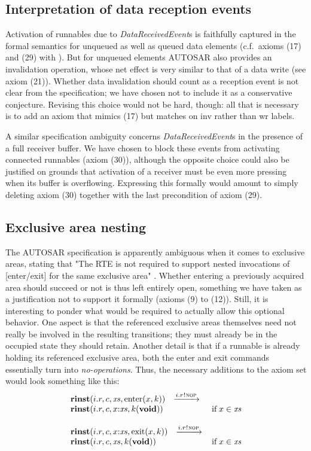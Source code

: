 \documentclass[10pt,conference]{IEEEtran}
\begin{document}
\subsection{Interpretation of data reception events}

Activation of runnables due to \emph{DataReceived\-Event}s is faithfully captured in the formal semantics for unqueued as well as queued data elements (c.f.~axioms (17) and (29) with \cite[ch.~7.5.1.6]{AR:SWC}). But for unqueued elements AUTOSAR also provides an invalidation operation, whose net effect is very similar to that of a data write (see axiom (21)). Whether data invalidation should count as a reception event is not clear from the specification; we have chosen not to include it as a conservative conjecture. Revising this choice would not be hard, though: all that is necessary is to add an axiom that mimics (17) but matches on {\sc inv} rather than {\sc wr} labels.

A similar specification ambiguity concerns \emph{DataReceived\-Event}s in the presence of a full receiver buffer. We have chosen to block these events from activating connected runnables (axiom (30)), although the opposite choice could also be justified on grounds that activation of a receiver must be even more pressing when its buffer is overflowing. Expressing this formally would amount to simply deleting axiom (30) together with the last precondition of axiom (29).


\subsection{Exclusive area nesting} \label{sec:ExclNest}

The AUTOSAR specification is apparently ambiguous when it comes to exclusive areas, stating that "The RTE is not required to support nested invocations of [enter/exit] for the same exclusive area" \cite[ch.~5.6.28-29]{AR:RTE}. Whether entering a previously acquired area should succeed or not is thus left entirely open, something we have taken as a justification not to support it formally (axioms (9) to (12)). Still, it is interesting to ponder what would be required to actually allow this optional behavior. One aspect is that the referenced exclusive areas themselves need not really be involved in the resulting transitions; they must already be in the occupied state they should retain. Another detail is that if a runnable is already holding its referenced exclusive area, both the enter and exit commands essentially turn into \emph{no-operations}. Thus, the necessary additions to the axiom set would look something like this:
$$
\begin{array}{lcll}
		{\Trinst {i.r} c \Xs {\TrteEnter x k}}
		\;\; \red{\Tsay {i.r} \Tnop} \\
		{\Trinst {i.r} c {\Tcons x \Xs} {\Tap k \Tvoid}}
		& \Pif\;x \in \Xs
\\ \\
		{\Trinst {i.r} c {\Tcons x \Xs} {\TrteExit x k}}
		\;\; \red{\Tsay {i.r} \Tnop} \\
		{\Trinst {i.r} c \Xs {\Tap k \Tvoid}}
		& \Pif\;x \in \Xs
\end{array}
$$
\end{document}
